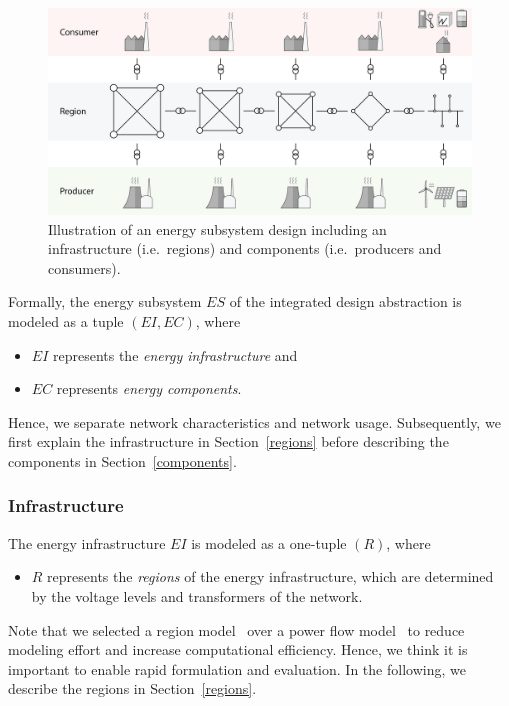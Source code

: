 \begin{figure}[h]
	\begin{center}
	\includegraphics[trim=0 10 0 15, width=0.95\columnwidth]{./gfx/energy_system.png}
	\caption{Illustration of an energy subsystem design including an infrastructure (i.e.\ regions) and components (i.e.\ producers and consumers).}
	\label{energy_illustration}
	\end{center}
\end{figure}

Formally, the energy subsystem $ES$ of the integrated design abstraction is modeled as a tuple $(EI, EC)$, where
\begin{itemize}
	\item $EI$ represents the \textit{energy infrastructure} and
	\item $EC$ represents \textit{energy components}.
\end{itemize}
Hence, we separate network characteristics and network usage. Subsequently, we first explain the infrastructure in Section~\ref{regions} before describing the components in Section~\ref{components}.

\subsubsection{Infrastructure}
\label{energy_infrastructure}

The energy infrastructure $EI$ is modeled as a one-tuple $(R)$, where
\begin{itemize}
	\item $R$ represents the \textit{regions} of the energy infrastructure, which are determined by the voltage levels and transformers of the network.
\end{itemize}
Note that we selected a region model~\cite{Hackenberg2012} over a power flow model~\cite{Dommel1968} to reduce modeling effort and increase computational efficiency. Hence, we think it is important to enable rapid formulation and evaluation. In the following, we describe the regions in Section~\ref{regions}.


